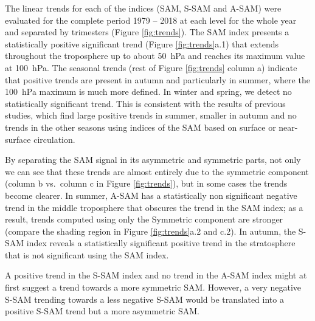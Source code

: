 \documentclass[smallextended]{svjour3}       %
\begin{document}
The linear trends for each of the indices (SAM, S\nobreakdash-SAM and A\nobreakdash-SAM) were evaluated for the complete period 1979 -- 2018 at each level for the whole year and separated by trimesters (Figure \ref{fig:trends}).
The SAM index presents a statistically positive significant trend (Figure \ref{fig:trends}a.1) that extends throughout the troposphere up to about 50~hPa and reaches its maximum value at 100~hPa.
The seasonal trends (rest of Figure \ref{fig:trends} column a) indicate that positive trends are present in autumn and particularly in summer, where the 100~hPa maximum is much more defined.
In winter and spring, we detect no statistically significant trend.
This is consistent with the results of previous studies, which find large positive trends in summer, smaller in autumn and no trends in the other seasons \citep[e.g.][ and references therein]{fogt2020} using indices of the SAM based on surface or near-surface circulation.

By separating the SAM signal in its asymmetric and symmetric parts, not only we can see that these trends are almost entirely due to the symmetric component (column b vs.~column c in Figure \ref{fig:trends}), but in some cases the trends become clearer.
In summer, A\nobreakdash-SAM has a statistically non significant negative trend in the middle troposphere that obscures the trend in the SAM index; as a result, trends computed using only the Symmetric component are stronger (compare the shading region in Figure \ref{fig:trends}a.2 and c.2).
In autumn, the S\nobreakdash-SAM index reveals a statistically significant positive trend in the stratosphere that is not significant using the SAM index.

A positive trend in the S\nobreakdash-SAM index and no trend in the A\nobreakdash-SAM index might at first suggest a trend towards a more symmetric SAM.
However, a very negative S\nobreakdash-SAM trending towards a less negative S\nobreakdash-SAM would be translated into a positive S\nobreakdash-SAM trend but a more asymmetric SAM.
\end{document}
